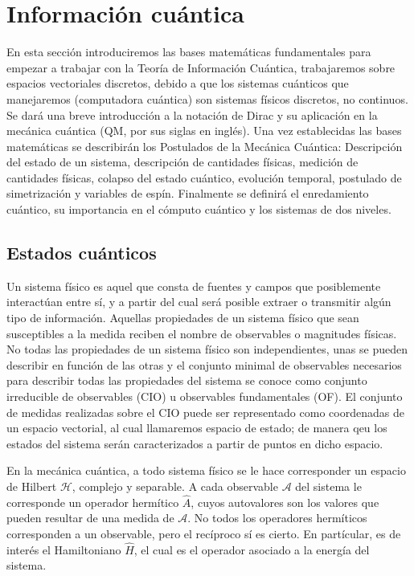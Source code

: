 \chapter{Información cuántica}

En esta sección introduciremos las bases matemáticas fundamentales para empezar a trabajar con la Teoría de Información Cuántica, trabajaremos sobre espacios vectoriales discretos, debido a que los sistemas cuánticos que manejaremos (computadora cuántica) son sistemas físicos discretos, no continuos. Se dará una breve introducción a la notación de Dirac y su aplicación en la mecánica cuántica (QM, por sus siglas en inglés). Una vez establecidas las bases matemáticas se describirán los Postulados de la Mecánica Cuántica: Descripción del estado de un sistema, descripción de cantidades físicas, medición de cantidades físicas, colapso del estado cuántico, evolución temporal, postulado de simetrización y variables de espín. Finalmente se definirá el enredamiento cuántico, su importancia en el cómputo cuántico y los sistemas de dos niveles.

\section{Estados cuánticos}

Un sistema físico es aquel que consta de fuentes y campos que posiblemente interactúan entre sí, y a partir del cual será posible extraer o transmitir algún tipo de información. Aquellas propiedades de un sistema físico que sean susceptibles a la medida reciben el nombre de observables o magnitudes físicas. No todas las propiedades de un sistema físico son independientes, unas se pueden describir en función de las otras y el conjunto minimal de observables necesarios para describir todas las propiedades del sistema se conoce como conjunto irreducible de observables (CIO) u observables fundamentales (OF). El conjunto de medidas realizadas sobre el CIO puede ser representado como coordenadas de un espacio vectorial, al cual llamaremos espacio de estado; de manera qeu los estados del sistema serán caracterizados a partir de puntos en dicho espacio.

En la mecánica cuántica, a todo sistema físico se le hace corresponder un espacio de Hilbert $\mathcal{H}$, complejo y separable. A cada observable $\mathcal{A}$ del sistema le corresponde un operador hermítico $\hat{A}$, cuyos autovalores son los valores que pueden resultar de una medida de $\mathcal{A}$. No todos los operadores hermíticos corresponden a un observable, pero el recíproco sí es cierto. En partícular, es de interés el Hamiltoniano $\hat{H}$, el cual es el operador asociado a la energía del sistema.


